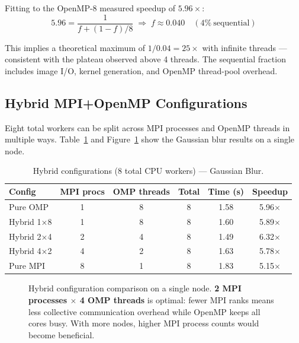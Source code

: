 \documentclass[12pt,a4paper]{article}
\begin{document}
Fitting to the OpenMP-8 measured speedup of $5.96\times$:
\[
  5.96 = \frac{1}{f + (1-f)/8}
  \;\Longrightarrow\;
  f \approx 0.040 \quad (4\%\ \text{sequential})
\]

This implies a theoretical maximum of $1/0.04 = 25\times$ with infinite
threads --- consistent with the plateau observed above 4 threads. The
sequential fraction includes image I/O, kernel generation, and OpenMP
thread-pool overhead.

\subsection{Hybrid MPI+OpenMP Configurations}

Eight total workers can be split across MPI processes and OpenMP threads in
multiple ways. Table~\ref{tab:hybrid-configs} and
Figure~\ref{fig:hybrid-bar} show the Gaussian blur results on a single node.

\begin{table}[H]
\centering
\caption{Hybrid configurations (8 total CPU workers) --- Gaussian Blur.}
\label{tab:hybrid-configs}
\begin{tabular}{lccccc}
\toprule
\textbf{Config} & \textbf{MPI procs} & \textbf{OMP threads} &
\textbf{Total} & \textbf{Time (s)} & \textbf{Speedup} \\
\midrule
Pure OMP    & 1 & 8 & 8 & 1.58 & 5.96$\times$ \\
Hybrid 1×8  & 1 & 8 & 8 & 1.60 & 5.89$\times$ \\
Hybrid 2×4  & 2 & 4 & 8 & 1.49 & 6.32$\times$ \\
Hybrid 4×2  & 4 & 2 & 8 & 1.63 & 5.78$\times$ \\
Pure MPI    & 8 & 1 & 8 & 1.83 & 5.15$\times$ \\
\bottomrule
\end{tabular}
\end{table}

\begin{figure}[H]
\centering
{}
\caption{Hybrid configuration comparison on a single node. \textbf{2 MPI
         processes $\times$ 4 OMP threads} is optimal: fewer MPI ranks means
         less collective communication overhead while OpenMP keeps all cores
         busy. With more nodes, higher MPI process counts would become
         beneficial.}
\label{fig:hybrid-bar}
\end{figure}
\end{document}
